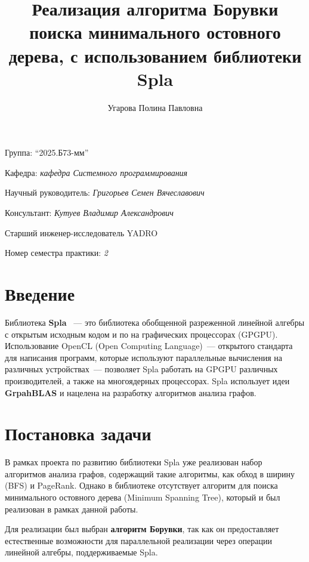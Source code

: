 \documentclass[a4paper]{article}
\title{Реализация алгоритма Борувки поиска минимального остовного дерева, с использованием библиотеки Spla}
\author{Угарова Полина Павловна}
\date{}
\begin{document}
\maketitle

\begin{flushright}
    Группа: \enquote{2025.Б73-мм}

    Кафедра: \emph{кафедра Системного программирования}

    Научный руководитель: \emph{Григорьев Семен Вячеславович}

    Консультант: \emph{Кутуев Владимир Александрович}
    
    Старший инженер-исследователь YADRO
    
    Номер семестра практики: \emph{2}
\end{flushright} 

\section{Введение}
Библиотека \textbf{Spla} \cite{spla_orig, orachev}~--- это библиотека обобщенной разреженной линейной алгебры с открытым исходным кодом и по на графических процессорах (GPGPU). Использование OpenCL (Open Computing Language)~--- открытого стандарта для написания программ, которые используют параллельные вычисления на различных устройствах~--- позволяет Spla работать на GPGPU различных производителей, а также на многоядерных процессорах. Spla использует идеи \textbf{GrpahBLAS} \cite{graphblas} и нацелена на разработку алгоритмов анализа графов.
\section{Постановка задачи}

В рамках проекта по развитию библиотеки Spla уже реализован набор алгоритмов анализа графов, содержащий такие алгоритмы, как обход в ширину (BFS) и PageRank. Однако в библиотеке отсутствует алгоритм для поиска минимального остовного дерева (Minimum Spanning Tree), который и был реализован в рамках данной работы.

Для реализации был выбран \textbf{алгоритм Борувки}, так как он предоставляет естественные возможности для параллельной реализации через операции линейной алгебры, поддерживаемые Spla.
\end{document}
